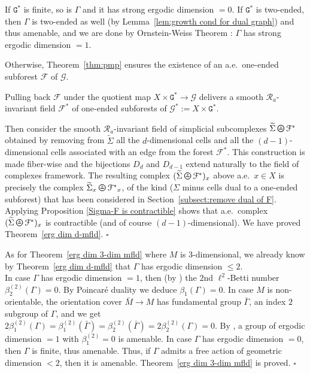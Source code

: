 \documentclass[11pt]{amsart}
\theoremstyle{definition}
\theoremstyle{plain}
\newcommand{\<}{\langle}
\renewcommand{\>}{\rangle}
\newcommand{\pmp}{\text{p.m.p.}}
\newcommand\RR{\mathscr{R}}
\newcommand\GGG{\mathtt{G}}
\newcommand\GG{\mathcal{G}}
\newcommand{\Dual}{D}
\newcommand{\oPerpStar}{\begin{tikzpicture}[scale=0.134]
\draw[thick,line width=0.7pt](-0.6,-0.2)--(0.6,-0.2) ;
    \draw (0,0.1) node[scale=0.6] {\rm{*}};
  \draw[line width=0.7pt] (0,0) circle [radius=1];
\end{tikzpicture}}
\newcommand{\oPerpstar}{\mathbin{\raisebox{-1pt}{\oPerpStar}}}
\begin{document}
If ${{\GGG}^*}$ is finite, so is $\Gamma$ and it has strong ergodic dimension $=0$.
If ${{\GGG}^*}$ is two-ended, then $\Gamma$ is  two-ended as well (by Lemma~\ref{lem:growth cond for dual graph}) and thus amenable, and we are done by Ornstein-Weiss Theorem \cite{OW80}: $\Gamma$ has strong ergodic dimension $=1$.

Otherwise, Theorem~\ref{thm:pmp} ensures the existence of an a.e.\  one-ended subforest ${\mathcal{F}}$ of $\GG$.


Pulling back ${\mathcal{F}}$ under the quotient map $X\times {{\GGG}^*} \longrightarrow \GG$ delivers a smooth $\RR_a$-invariant field ${\mathcal{F}^{*}}$ of one-ended subforests of ${\GG^{*}}:=X\times {{\GGG}^*}$.



Then consider the smooth $\RR_a$-invariant field of simplicial subcomplexes $\widetilde{{\Sigma} }\oPerpstar {{\mathcal{F}^{*}}}$ obtained by removing from $\widetilde{{\Sigma} }$ all the $d$-dimensional cells and all the $(d-1)$-dimensional cells associated with an edge from the forest ${\mathcal{F}^{*}}$. This construction is made fiber-wise and the bijections $\Dual_{d}$ and $\Dual_{d-1}$ extend naturally to the field of complexes framework. The resulting complex $(\widetilde{{\Sigma} }\oPerpstar {{\mathcal{F}^{*}}})_x$ above a.e.\  $x\in X$ is precisely the complex $\widetilde{{\Sigma} }_{x}\oPerpstar{{\mathcal{F}^{*}}_{x}}$, of the kind (${\Sigma} $ minus cells dual to a one-ended subforest) that has been considered in Section~\ref{subsect:remove dual of F}. Applying Proposition \ref{Sigma-F is contractible} shows that a.e.\  complex $(\widetilde{{\Sigma} }\oPerpstar{{\mathcal{F}^{*}}})_x$ is contractible (and of course $(d-1)$-dimensional).
We have proved Theorem~\ref{erg dim d-mfld}. \hfill$\square$


\bigskip
As for Theorem~\ref{erg dim 3-dim mfld} where $M$ is $3$-dimensional, we already know by Theorem~\ref{erg dim d-mfld} that $\Gamma$ has ergodic dimension $\leq 2$.\\
In case $\Gamma$ has ergodic dimension $=1$, then (by \cite[Cor. 3.17]{Gab02}) the $2$nd $\ell^2$-Betti number $\beta_{2}^{(2)}(\Gamma)=0$.
By Poincar\'e duality \cite[Sect. 5]{CG86} we deduce $\beta_1(\Gamma)=0$.
In case $M$ is non-orientable, the orientation cover $\bar{M}\to M$ has fundamental group $\bar{\Gamma}$, an index $2$ subgroup of $\Gamma$, and we get
 $2 \beta_{1}^{(2)}(\Gamma)= \beta_{1}^{(2)}(\bar{\Gamma})=\beta_{2}^{(2)}(\bar{\Gamma})=2 \beta_{2}^{(2)}(\Gamma)=0$.
By \cite[Prop. 6.10]{Gab02}, a group of ergodic dimension $=1$ with $\beta_1^{(2)}=0$ is amenable.
In case $\Gamma$ has ergodic dimension $=0$, then $\Gamma$ is finite, thus amenable.
Thus, if $\Gamma$ admits a \pmp{} free action of geometric dimension $<2$, then it is amenable.
Theorem~\ref{erg dim 3-dim mfld} is proved.
\hfill $\square$
\end{document}
